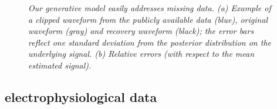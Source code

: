 \documentclass[journal]{IEEEtran}
\begin{document}
\begin{figure}[!htbp]
\centering
{} 
  \caption{\small \emph{ Our generative model easily addresses missing data.
(a) Example of a clipped waveform from the publicly available data (blue), original waveform (gray) and
  recovery waveform (black); the error bars reflect one standard deviation from the posterior distribution on the underlying signal. (b) Relative errors (with respect to the mean estimated signal).
   }}
\end{figure}




\subsection{ electrophysiological data\label{sec:forensics}}
\end{document}
